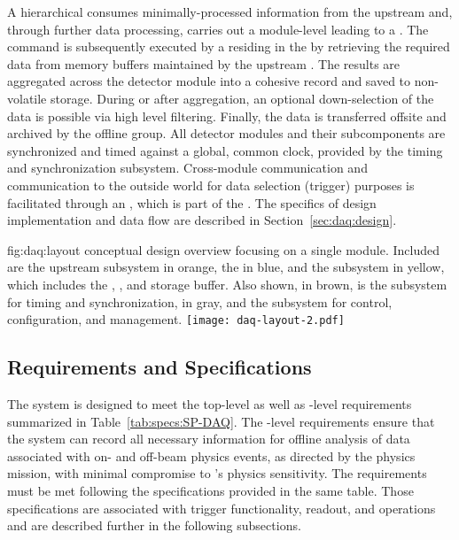 A
hierarchical  consumes minimally-processed
information from the upstream  and, through further data processing, 
carries out a module-level  leading to a .
The command is subsequently executed by a  residing in the 
by retrieving the required data from memory buffers maintained by the upstream .
The results are aggregated across the detector module into a cohesive record and saved to non-volatile storage.
During or after aggregation, an optional down-selection of the data is possible via
high level filtering.
Finally, the data is  transferred offsite and archived by the  offline group.
All
detector modules and their subcomponents are synchronized and timed against a global,
common clock, provided by the timing and synchronization
subsystem. Cross-module communication and communication
to the outside world for data selection (trigger) purposes is facilitated
through an , which is part of the . The
specifics of design implementation and data flow are described in Section~\ref{sec:daq:design}.

\begin{dunefigure}{fig:daq:layout}{ conceptual design overview focusing
    on a single \nominalmodsize module. Included are the upstream
     subsystem in orange, the  in
    blue, and the  subsystem in yellow,
    which includes the , , and storage buffer. 
    Also shown, in brown, is the subsystem for timing and
    synchronization, in gray, and the subsystem for control,
    configuration, and management.
  }
  \texttt{[image: daq-layout-2.pdf]}
\end{dunefigure}


\subsection{Requirements and Specifications}
\label{sec:daq:requirements}

The    system is designed to meet the
 top-level as well as -level requirements
summarized in 
Table~\ref{tab:specs:SP-DAQ}. 
The -level requirements ensure that the 
system
can record all necessary information for offline 
analysis of data associated with on- and off-beam physics events, as directed
by the  physics mission, with minimal compromise to
's physics sensitivity. The requirements must be met following the 
specifications provided in the same table.
Those specifications are
associated with trigger functionality, readout,
and operations and are described further in the following subsections.

